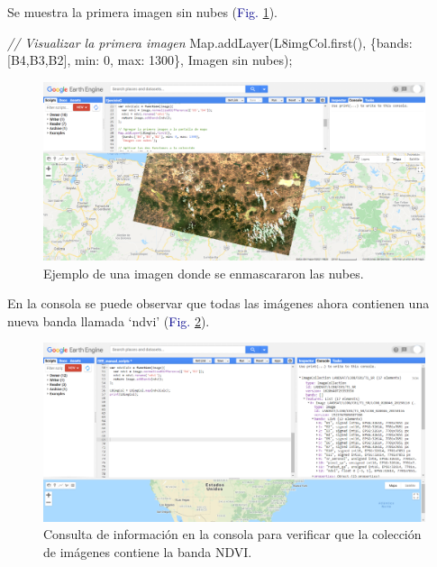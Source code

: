 \documentclass[
  12pt,
  letterpaper,
  twoside]{book}
\newenvironment{Shaded}{\begin{snugshade}}{\end{snugshade}}
\newcommand{\CommentTok}[1]{\textcolor[rgb]{0.24,0.58,0.00}{\textit{#1}}}
\newcommand{\DataTypeTok}[1]{\textcolor[rgb]{0.00,0.00,0.00}{#1}}
\newcommand{\DecValTok}[1]{\textcolor[rgb]{0.28,0.53,0.93}{#1}}
\newcommand{\FunctionTok}[1]{\textcolor[rgb]{0.48,0.12,0.64}{#1}}
\newcommand{\KeywordTok}[1]{\textcolor[rgb]{0.48,0.12,0.64}{#1}}
\newcommand{\NormalTok}[1]{#1}
\newcommand{\OperatorTok}[1]{\textcolor[rgb]{0.00,0.00,0.00}{#1}}
\newcommand{\StringTok}[1]{\textcolor[rgb]{0.87,0.29,0.22}{#1}}
\begin{document}
Se muestra la primera imagen sin nubes (\textcolor{darkblue}{Fig.} \ref{fig:f1018}).

\begin{Shaded}
\begin{Highlighting}[]
\CommentTok{// Visualizar la primera imagen}
\KeywordTok{Map}\OperatorTok{.}\FunctionTok{addLayer}\NormalTok{(L8imgCol}\OperatorTok{.}\FunctionTok{first}\NormalTok{()}\OperatorTok{,} 
\NormalTok{  \{}\DataTypeTok{bands}\OperatorTok{:}\NormalTok{[}\StringTok{\textquotesingle{}B4\textquotesingle{}}\OperatorTok{,}\StringTok{\textquotesingle{}B3\textquotesingle{}}\OperatorTok{,}\StringTok{\textquotesingle{}B2\textquotesingle{}}\NormalTok{]}\OperatorTok{,} \DataTypeTok{min}\OperatorTok{:} \DecValTok{0}\OperatorTok{,} \DataTypeTok{max}\OperatorTok{:} \DecValTok{1300}\NormalTok{\}}\OperatorTok{,}
  \StringTok{\textquotesingle{}Imagen sin nubes\textquotesingle{}}\NormalTok{)}\OperatorTok{;}
\end{Highlighting}
\end{Shaded}

\begin{figure}[H]

{\centering \includegraphics[width=0.95\linewidth]{Img/imSinNubes} 

}

\caption{Ejemplo de una imagen donde se enmascararon las nubes.}\label{fig:f1018}
\end{figure}

En la consola se puede observar que todas las imágenes ahora contienen una nueva banda llamada `ndvi' (\textcolor{darkblue}{Fig.} \ref{fig:f1019}).

\begin{figure}[H]

{\centering \includegraphics[width=0.95\linewidth]{Img/imConNDVI} 

}

\caption{Consulta de información en la consola para verificar que la colección de imágenes contiene la banda NDVI.}\label{fig:f1019}
\end{figure}
\end{document}
